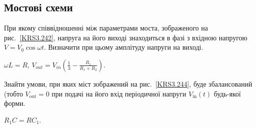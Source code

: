 \subsection*{Мостові схеми}

\begin{problem}\label{prb:KRS3.242}
При якому співвідношенні між параметрами моста, зображеного на рис.~\ref{KRS3.242}, напруга на його виході знаходиться в фазі з вхідною напругою $V = V_0\cos\omega t$. Визначити при цьому амплітуду напруги на виході.
\begin{solution}
	$\omega L = R$, $V_{out} = V_{in} \left( \frac13 - \frac{R_1}{R_1 + R_2}\right) $.
\end{solution}
\end{problem}

\begin{problem}\label{prb:KRS3.244}
Знайти умови,  при яких міст зображений на рис.~\ref{KRS3.244}, буде збалансований (тобто $V_{\mathrm{out}} = 0$ при подачі на його
вхід періодичної напруги $V_{\mathrm{in}}(t)$ будь-якої форми.
\begin{solution}
	$R_1C = RC_1$.
\end{solution}
\end{problem}


